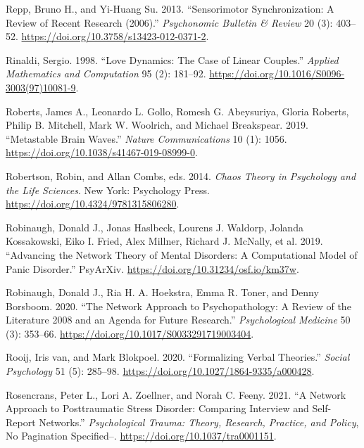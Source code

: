 \documentclass[
  a4paper,
  DIV=11,
  numbers=noendperiod,
  oneside]{scrreprt}
\newlength{\cslhangindent}
\newenvironment{CSLReferences}[2] %
 {\begin{list}{}{%
  \setlength{\itemindent}{0pt}
  \setlength{\leftmargin}{0pt}
  \setlength{\parsep}{0pt}
  \ifodd #1
   \setlength{\leftmargin}{\cslhangindent}
   \setlength{\itemindent}{-1\cslhangindent}
  \fi
  \setlength{\itemsep}{#2\baselineskip}}}
 {\end{list}}
\begin{document}
\begin{CSLReferences}{1}{0}
Repp, Bruno H., and Yi-Huang Su. 2013. {``Sensorimotor Synchronization:
{A} Review of Recent Research (2006).''}
\emph{Psychonomic Bulletin \& Review} 20 (3): 403--52.
\url{https://doi.org/10.3758/s13423-012-0371-2}.

Rinaldi, Sergio. 1998. {``Love Dynamics: {The} Case of Linear
Couples.''} \emph{Applied Mathematics and Computation} 95 (2): 181--92.
\url{https://doi.org/10.1016/S0096-3003(97)10081-9}.

Roberts, James A., Leonardo L. Gollo, Romesh G. Abeysuriya, Gloria
Roberts, Philip B. Mitchell, Mark W. Woolrich, and Michael Breakspear.
2019. {``Metastable Brain Waves.''} \emph{Nature Communications} 10 (1):
1056. \url{https://doi.org/10.1038/s41467-019-08999-0}.

Robertson, Robin, and Allan Combs, eds. 2014. \emph{Chaos Theory in
{Psychology} and the {Life Sciences}}. {New York}: {Psychology Press}.
\url{https://doi.org/10.4324/9781315806280}.

Robinaugh, Donald J., Jonas Haslbeck, Lourens J. Waldorp, Jolanda
Kossakowski, Eiko I. Fried, Alex Millner, Richard J. McNally, et al.
2019. {``Advancing the {Network Theory} of {Mental Disorders}: {A
Computational Model} of {Panic Disorder}.''} {PsyArXiv}.
\url{https://doi.org/10.31234/osf.io/km37w}.

Robinaugh, Donald J., Ria H. A. Hoekstra, Emma R. Toner, and Denny
Borsboom. 2020. {``The Network Approach to Psychopathology: A Review of
the Literature 2008 and an Agenda for Future
Research.''} \emph{Psychological Medicine} 50 (3): 353--66.
\url{https://doi.org/10.1017/S0033291719003404}.

Rooij, Iris van, and Mark Blokpoel. 2020. {``Formalizing Verbal
Theories.''} \emph{Social Psychology} 51 (5): 285--98.
\url{https://doi.org/10.1027/1864-9335/a000428}.

Rosencrans, Peter L., Lori A. Zoellner, and Norah C. Feeny. 2021. {``A
Network Approach to Posttraumatic Stress Disorder: {Comparing} Interview
and Self-Report Networks.''} \emph{Psychological Trauma: Theory,
Research, Practice, and Policy}, No Pagination Specified--.
\url{https://doi.org/10.1037/tra0001151}.


\end{CSLReferences}
\end{document}
